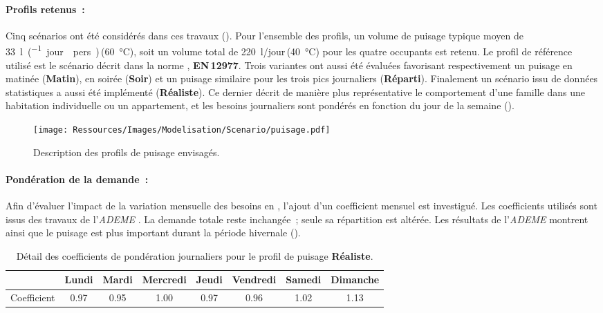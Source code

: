 \paragraph{Profils retenus~:} %
\label{par:profils_retenus}
Cinq scénarios ont été considérés dans ces travaux ().
Pour l’ensemble des profils, un volume de puisage typique moyen de
\SI{33}{\litre\per(jour\period pers)}\,(\SI{60}{\celsius}), soit un
volume total de \SI{220}{\litre/jour}\,(\SI{40}{\celsius}) pour les quatre occupants est
retenu. Le profil de référence utilisé est le scénario décrit dans la norme
\textcite{EN129771}, \textbf{EN\,12977}. Trois variantes ont aussi été évaluées favorisant
respectivement un puisage en matinée (\textbf{Matin}), en soirée (\textbf{Soir}) et un
puisage similaire pour les trois pics journaliers (\textbf{Réparti}). Finalement un scénario
issu de données statistiques \parencite{ADEME2016} a aussi été implémenté
(\textbf{Réaliste}). Ce dernier décrit de manière plus représentative le comportement
d’une famille dans une habitation individuelle ou un appartement, et les besoins
journaliers sont pondérés en fonction du jour de la semaine ().
\begin{figure}
    \centering
    \texttt{[image: Ressources/Images/Modelisation/Scenario/puisage.pdf]}
    \caption[Description des profils de puisage envisagés]
            {Description des profils de puisage envisagés.}
    \label{fig:profil_puisage}
\end{figure}

\paragraph{Pondération de la demande~:} %
\label{par:ponderation_de_la_demande}
Afin d’évaluer l’impact de la variation mensuelle des besoins en , l’ajout d’un
coefficient mensuel est investigué. Les coefficients utilisés sont issus des travaux de
l’\textit{ADEME} \parencite{ADEME2016}. La demande totale reste inchangée~; seule sa
répartition est altérée. Les résultats de l’\textit{ADEME} montrent ainsi que le puisage est plus
important durant la période hivernale ().

\begin{table}
\centering
\caption[Détail des coefficients de pondération journaliers pour le profil de puisage Réaliste]
        {Détail des coefficients de pondération journaliers pour le profil de
         puisage \textbf{Réaliste}.}
\label{tab:coef_semaine}
\begin{tabular}{l*{7}{c}}
    \toprule
                & Lundi & Mardi & Mercredi & Jeudi & Vendredi & Samedi & Dimanche \\
    \midrule
    Coefficient & \num{0.97}  & \num{0.95}  & \num{1.00}     & \num{0.97}  & \num{0.96}     & \num{1.02}   & \num{1.13}     \\
    \bottomrule
\end{tabular}
\end{table}

